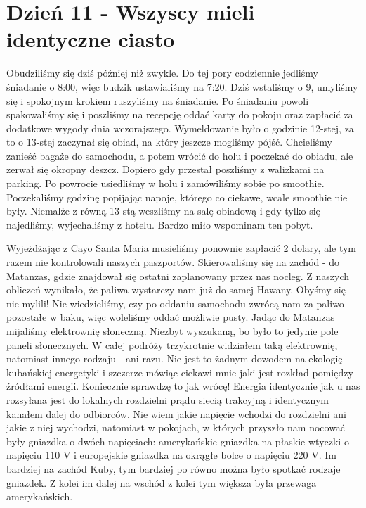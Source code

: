 
\chapter[Wszyscy mieli identyczne ciasto]{Dzień 11 - Wszyscy mieli identyczne ciasto}

Obudziliśmy się dziś później niż zwykle.
Do tej pory codziennie jedliśmy śniadanie o 8:00, więc budzik ustawialiśmy na 7:20.
Dziś wstaliśmy o 9, umyliśmy się i spokojnym krokiem ruszyliśmy na śniadanie.
Po śniadaniu powoli spakowaliśmy się i poszliśmy na recepcję oddać karty do pokoju oraz zapłacić za dodatkowe wygody dnia wczorajszego.
Wymeldowanie było o godzinie 12-stej, za to o 13-stej zaczynał się obiad, na który jeszcze mogliśmy pójść.
Chcieliśmy zanieść bagaże do samochodu, a potem wrócić do holu i poczekać do obiadu, ale zerwał się okropny deszcz.
Dopiero gdy przestał poszliśmy z walizkami na parking. 
Po powrocie usiedliśmy w holu i zamówiliśmy sobie po smoothie. 
Poczekaliśmy godzinę popijając napoje, którego co ciekawe, wcale smoothie nie były.
Niemalże z równą 13-stą weszliśmy na salę obiadową i gdy tylko się najedliśmy, wyjechaliśmy z hotelu.
Bardzo miło wspominam ten pobyt.
\par Wyjeżdżając z Cayo Santa Maria musieliśmy ponownie zapłacić 2 dolary, ale tym razem nie kontrolowali naszych paszportów.
Skierowaliśmy się na zachód - do Matanzas, gdzie znajdował się ostatni zaplanowany przez nas nocleg.
Z naszych obliczeń wynikało, że paliwa wystarczy nam już do samej Hawany.
Obyśmy się nie mylili!
Nie wiedzieliśmy, czy po oddaniu samochodu zwrócą nam za paliwo pozostałe w baku, więc woleliśmy oddać możliwie pusty.
Jadąc do Matanzas mijaliśmy elektrownię słoneczną.
Niezbyt wyszukaną, bo było to jedynie pole paneli słonecznych.
W całej podróży trzykrotnie widziałem taką elektrownię, natomiast innego rodzaju - ani razu.
Nie jest to żadnym dowodem na ekologię kubańskiej energetyki i szczerze mówiąc ciekawi mnie jaki jest rozkład pomiędzy źródłami energii.
Koniecznie sprawdzę to jak wrócę!
Energia identycznie jak u nas rozsyłana jest do lokalnych rozdzielni prądu siecią trakcyjną i identycznym kanałem dalej do odbiorców.
Nie wiem jakie napięcie wchodzi do rozdzielni ani jakie z niej wychodzi, natomiast w pokojach, w których przyszło nam nocować były gniazdka o dwóch napięciach: amerykańskie gniazdka na płaskie wtyczki o napięciu 110 V i europejskie gniazdka na okrągłe bolce o napięciu 220 V.
Im bardziej na zachód Kuby, tym bardziej po równo można było spotkać rodzaje gniazdek. 
Z kolei im dalej na wschód z kolei tym większa była przewaga amerykańskich.
